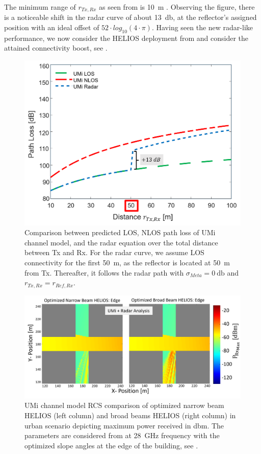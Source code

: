 The minimum range of $r_{Tx, Rx}$ as seen from  is \SI{10}{\meter} \cite{ETSI}. Observing the figure, there is a noticeable shift in the radar curve of about \SI{13}{\decibel}, at the reflector's assigned position with an ideal offset of $52\cdot log_{10}(4 \cdot \pi)$. Having seen the new radar-like performance, we now consider the HELIOS deployment from  and consider the attained connectivity boost, see .

\begin{figure}[H]
	\centering
	\includegraphics[width=0.8\linewidth]{images/Section 4 Images/UMi_Radar1}
	\caption{Comparison between predicted LOS, NLOS path loss of UMi channel model, and the radar equation over the total distance between Tx and Rx. For the radar curve, we assume LOS connectivity for the first \SI{50}{\meter}, as the reflector is located at \SI{50}{\meter} from Tx. Thereafter, it follows the radar path with $\sigma_{Meta}=\SI{0}{\decibel}$ and $r_{Tx, Rx}=r_{Ref, Rx}$.}
	\label{fig:UMi_Radar}
\end{figure}
\begin{figure}[H]
	\centering
	\includegraphics[width=0.83\linewidth]{images/Section 4 Images/UMi_Helios_urban}
	\caption{UMi channel model RCS comparison of optimized narrow beam HELIOS (left column) and broad beams HELIOS (right column) in urban scenario depicting maximum power received in \si{\decibel}m. The parameters are considered from  at \SI{28}{\giga\hertz} frequency with the optimized slope angles at the edge of the building, see	.}
	\label{fig:UMi_Helios_urban}
\end{figure}
